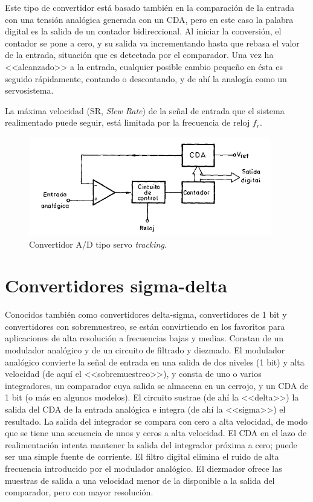 Este tipo de convertidor está basado también en la comparación de la entrada con una tensión analógica generada con un CDA, pero en este caso la palabra digital es la salida de un contador bidireccional. Al iniciar la conversión, el contador se pone a cero, y su salida va incrementando hasta que rebasa el valor de la entrada, situación que es detectada por el comparador. Una vez ha <<alcanzado>> a la entrada, cualquier posible cambio pequeño en ésta es seguido rápidamente, contando o descontando, y de ahí la analogía como un servosistema.

La máxima velocidad (SR, \textit{Slew Rate}) de la señal de entrada que el sistema realimentado puede seguir, está limitada por la frecuencia de reloj $f_r$.

\begin{figure}[H]
    \centering
    \includegraphics[width=0.75\linewidth]{Imagenes/Convertidores tipo servo.png}
    \caption{Convertidor A/D tipo servo \textit{tracking}.}
\end{figure}

\section{Convertidores sigma-delta}

Conocidos también como convertidores delta-sigma, convertidores de 1 bit y convertidores con sobremuestreo, se están convirtiendo en los favoritos para aplicaciones de alta resolución a frecuencias bajas y medias. Constan de un modulador analógico y de un circuito de filtrado y diezmado. El modulador analógico convierte la señal de entrada en una salida de dos niveles (1 bit) y alta velocidad (de aquí el <<sobremuestreo>>), y consta de uno o varios integradores, un comparador cuya salida se almacena en un cerrojo, y un CDA de 1 bit (o más en algunos modelos). El circuito sustrae (de ahí la <<delta>>) la salida del CDA de la entrada analógica e integra (de ahí la <<sigma>>) el resultado. La salida del integrador se compara con cero a alta velocidad, de modo que se tiene una secuencia de unos y ceros a alta velocidad. El CDA en el lazo de realimentación intenta mantener la salida del integrador próxima a cero; puede ser una simple fuente de corriente. El filtro digital elimina el ruido de alta frecuencia introducido por el modulador analógico. El diezmador ofrece las muestras de salida a una velocidad menor de la disponible a la salida del comparador, pero con mayor resolución.


